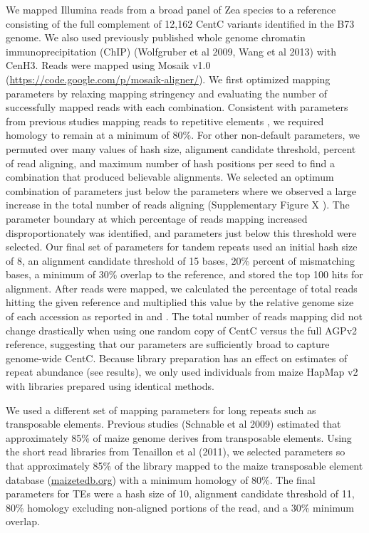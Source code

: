 We mapped Illumina reads from a broad panel of Zea species \citep{Chia2012,Tenaillon2011}  to a reference consisting of the full complement of 12,162 CentC variants identified in the B73 genome.  We also used previously published whole genome chromatin immunoprecipitation (ChIP) (Wolfgruber et al 2009, Wang et al 2013) with CenH3.  Reads were mapped using  Mosaik v1.0 (\url{https://code.google.com/p/mosaik-aligner/}). We first optimized mapping parameters by relaxing mapping stringency and evaluating the number of successfully mapped reads with each combination.  Consistent with parameters from previous studies mapping reads to repetitive elements \citep{Tenaillon2011}, we required homology to remain at a minimum of 80\%.  For other non-default parameters, we permuted over many values of hash size, alignment candidate threshold,  percent of read aligning, and maximum number of hash positions per seed to find a combination that produced believable alignments.  We selected an optimum combination of parameters just below the parameters where we observed a large increase in the total number of reads aligning (Supplementary Figure X ).   The parameter boundary at which percentage of reads mapping increased disproportionately was identified, and parameters just below this threshold were selected.  Our final set of parameters for tandem repeats used an initial hash size of 8, an alignment candidate threshold of 15 bases, 20\% percent of mismatching bases, a minimum of 30\% overlap to the reference, and stored the top 100 hits for alignment.  After reads were mapped, we calculated the percentage of total reads hitting the given reference and multiplied this value by the relative genome size of each accession as reported in \citet{Chia2012} and \citet{Tenaillon2011}.  The total number of reads mapping did not change drastically when using one random copy of CentC versus the full AGPv2 reference, suggesting that our parameters are sufficiently broad to capture genome-wide CentC.  Because library preparation has an effect on estimates of repeat abundance (see results), we only used individuals from maize HapMap v2 \citep{Chia2012} with libraries prepared using identical methods.
	
We used a different set of mapping parameters for long repeats such as transposable elements.  Previous studies (Schnable et al 2009) estimated that approximately 85\% of maize genome derives from transposable elements.  Using the short read libraries from Tenaillon et al (2011), we selected parameters so that approximately 85\% of the library mapped to the maize transposable element database (\url{maizetedb.org}) with a minimum homology of 80\%.  The final parameters for TEs were a hash size of 10, alignment candidate threshold of 11, 80\% homology excluding non-aligned portions of the read, and a 30\% minimum overlap. 

